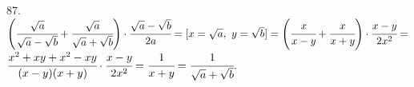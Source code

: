 87. $\left(\cfrac{\sqrt{a}}{\sqrt{a}-\sqrt{b}}+\cfrac{\sqrt{a}}{\sqrt{a}+\sqrt{b}}\right)\cdot\cfrac{\sqrt{a}-\sqrt{b}}{2a}=[x=\sqrt{a},\ y=\sqrt{b}]=
\left(\cfrac{x}{x-y}+\cfrac{x}{x+y}\right)\cdot\cfrac{x-y}{2x^2}=$\\$
\cfrac{x^2+xy+x^2-xy}{(x-y)(x+y)}\cdot\cfrac{x-y}{2x^2}=\cfrac{1}{x+y}=\cfrac{1}{\sqrt{a}+\sqrt{b}}.$\\
